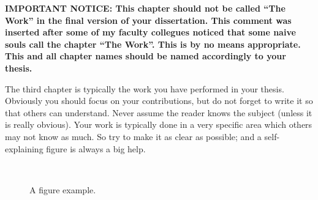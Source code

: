 
{\color{red}\bfseries IMPORTANT NOTICE: This chapter should not be called ``The Work'' in the final version of your dissertation. This comment was inserted after some of my faculty collegues noticed that some naive souls call the chapter ``The Work''. This is by no means appropriate. This and all chapter names should be named accordingly to your thesis.}

The third chapter is typically the work you have performed in your thesis. Obviously you should focus on your contributions, but do not forget to write it so that others can understand. Never assume the reader knows the subject (unless it is really obvious). Your work is typically done in a very specific area which others may not know as much. So try to make it as clear as possible; and a self-explaining figure is always a big help.

\begin{figure}[t]
\centering
{}
\hspace*{0.5cm}
\\
\caption{A figure example.}
\label{fig:rmain figure}
\end{figure}

